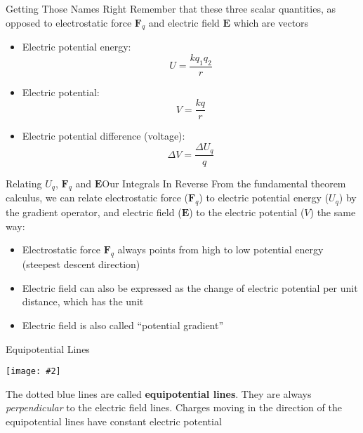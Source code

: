 \documentclass[12pt,aspectratio=169]{beamer}
\newcommand{\pic}[2]{\texttt{[image: \#2]}}
\newcommand{\mb}[1]{\mathbf{#1}}
\newcommand{\eq}[2]{\vspace{#1}{
    \Large\begin{displaymath}#2\end{displaymath}}
}
\begin{document}
\begin{frame}{Getting Those Names Right}
  Remember that these three scalar quantities, as opposed to electrostatic
  force $\mb{F}_q$ and electric field $\mb{E}$ which are vectors
  \begin{itemize}
  \item Electric potential energy:
    \begin{displaymath}
      U=\frac{kq_1q_2}{r}
    \end{displaymath}
  \item Electric potential:
    \begin{displaymath}
      V=\frac{kq}{r}
    \end{displaymath}
  \item Electric potential difference (voltage):
    \begin{displaymath}
      \Delta V=\frac{\Delta U_q}{q}
    \end{displaymath}
  \end{itemize}
\end{frame}


\begin{frame}{Relating $U_q$, $\mb{F}_q$ and $\mb{E}$}{Our Integrals In Reverse}
  From the fundamental theorem calculus, we can relate electrostatic force
  ($\mb{F}_q$) to electric potential energy ($U_q$) by the gradient operator,
  and electric field ($\mb{E}$) to the electric potential ($V$) the same way:

  \eq{-.2in}{
    \mb{F}_q=-\nabla U_q=-\frac{\partial U_q}{\partial r}\hat{\mb{r}}
    \quad\;\;
    \mb{E}=-\nabla V=-\frac{\partial V}{\partial r}\hat{\mb{r}}
  }
  \begin{itemize}  
  \item Electrostatic force $\mb{F}_q$ always points from high to
    low potential energy (steepest descent direction)
  \item Electric field can also be expressed as the change of electric
    potential per unit distance, which has the unit
    
    \eq{-.2in}{
      \SI{1}{\newton\per\coulomb}=\SI{1}{\volt\per\metre}
    }
  \item Electric field is also called ``potential gradient''
  \end{itemize}
\end{frame}



\begin{frame}{Equipotential Lines}
  \begin{center}
    \pic{0.65}{plate3.png}
  \end{center}
  The dotted blue lines are called \textbf{equipotential lines}. They are
  always \emph{perpendicular} to the electric field lines. Charges moving in
  the direction of the equipotential lines have constant electric potential
\end{frame}
\end{document}
